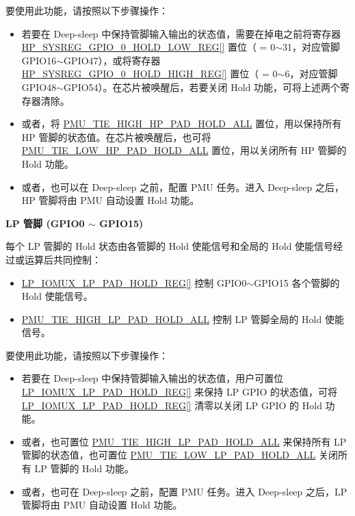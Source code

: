 \documentclass[main\_\_CN.tex]{subfiles}
\begin{document}
{要使用此功能，请按照以下步骤操作：
\begin{itemize}
        \item 若要在 Deep-sleep 中保持管脚输入输出的状态值，需要在掉电之前将寄存器 \hyperref[regdesc:HPSYS0HOLDLOWREG]{HP\_SYSREG\_GPIO\_0\_HOLD\_LOW\_REG[]} 置位（ = 0$\sim$31，对应管脚 GPIO16$\sim$GPIO47），或将寄存器  \hyperref[regdesc:HPSYS0HOLDHIGHREG]{HP\_SYSREG\_GPIO\_0\_HOLD\_HIGH\_REG[]} 置位（ = 0$\sim$6，对应管脚 GPIO48$\sim$GPIO54）。在芯片被唤醒后，若要关闭 Hold 功能，可将上述两个寄存器清除。 
        \item 或者，将 \hyperref[fielddesc:PMUTIEHIGHHPPADHOLDALL]{PMU\_TIE\_HIGH\_HP\_PAD\_HOLD\_ALL} 置位，用以保持所有 HP 管脚的状态值。在芯片被唤醒后，也可将 \hyperref[fielddesc:PMUTIELOWHPPADHOLDALL]{PMU\_TIE\_LOW\_HP\_PAD\_HOLD\_ALL} 置位，用以关闭所有 HP 管脚的 Hold 功能。
        \item 或者，也可以在 Deep-sleep 之前，配置 PMU 任务。进入 Deep-sleep 之后，HP 管脚将由 PMU 自动设置 Hold 功能。
    \end{itemize}

\textbf{LP 管脚 (GPIO0 $\sim$ GPIO15)}

每个 LP 管脚的 Hold 状态由各管脚的 Hold 使能信号和全局的 Hold 使能信号经过或运算后共同控制：
\begin{itemize}
    \item \hyperref[regdesc:LPIOMUXLPPADHOLDREG]{LP\_IOMUX\_LP\_PAD\_HOLD\_REG[]} 控制 GPIO0$\sim$GPIO15 各个管脚的 Hold 使能信号。
    \item \hyperref[fielddesc:PMUTIEHIGHLPPADHOLDALL]{PMU\_TIE\_HIGH\_LP\_PAD\_HOLD\_ALL} 控制 LP 管脚全局的 Hold 使能信号。
\end{itemize}

要使用此功能，请按照以下步骤操作：    
\begin{itemize}
        \item 若要在 Deep-sleep 中保持管脚输入输出的状态值，用户可置位 \hyperref[regdesc:LPIOMUXLPPADHOLDREG]{LP\_IOMUX\_LP\_PAD\_HOLD\_REG[]} 来保持 LP GPIO 的状态值，可将 \hyperref[regdesc:LPIOMUXLPPADHOLDREG]{LP\_IOMUX\_LP\_PAD\_HOLD\_REG[]} 清零以关闭 LP GPIO 的 Hold 功能。 
        \item 或者，也可置位 \hyperref[fielddesc:PMUTIEHIGHLPPADHOLDALL]{PMU\_TIE\_HIGH\_LP\_PAD\_HOLD\_ALL} 来保持所有 LP 管脚的状态值，也可置位 \hyperref[fielddesc:PMUTIELOWLPPADHOLDALL]{PMU\_TIE\_LOW\_LP\_PAD\_HOLD\_ALL} 关闭所有 LP 管脚的 Hold 功能。
        \item 或者，也可在 Deep-sleep 之前，配置 PMU 任务。进入 Deep-sleep 之后，LP 管脚将由 PMU 自动设置 Hold 功能。
    \end{itemize}
}
\end{document}
